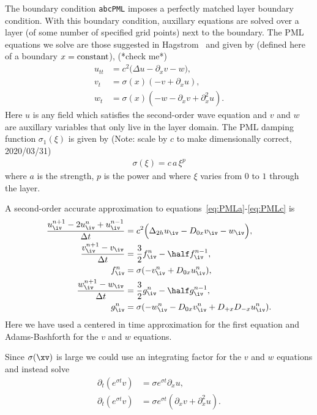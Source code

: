 \documentclass{article}
\begin{document}
The boundary condition {\tt abcPML} imposes a perfectly matched layer boundary condition.
With this boundary condition, auxillary equations are solved over a layer (of some number of
specified grid points) next to the boundary. The PML equations we solve
are those suggested in Hagstrom~\cite{Hagstrom1999} and given by (defined here of a boundary $x={\rm constant}$), (*check me*)
\begin{align}
  u_{tt} &= c^2 \Big( \Delta u - \partial_x v - w \Big), \label{eq:PMLa} \\
   v_t &= \sigma(x)( -v + \partial_x u ) , \\
   w_t &= \sigma(x) ( -w  - \partial_x v + \partial_x^2 u ). \label{eq:PMLc}
\end{align}
Here $u$ is any field which satisfies the second-order wave equation and $v$ and $w$ are auxillary variables
that only live in the layer domain. 
The PML damping function $\sigma_1(\xi)$ is given by (Note: scale by $c$ to make dimensionally correct, 2020/03/31) 
\begin{align}
  \sigma(\xi) = c\, a \, \xi^p
\end{align}
where $a$ is the strength, $p$ is the power and where $\xi$ varies from $0$ to $1$ through the layer.



A second-order accurate approximation to equations~\eqref{eq:PMLa}-\eqref{eq:PMLc} is
\begin{align}
  {u_\iv^{n+1} - 2 u_\iv^n + u_\iv^{n-1} \over \dt} &= c^2 \Big( \Delta_{2h} u_\iv - D_{0x} v_\iv  - w_\iv \Big), \label{eq:PMLorder2a}\\
  {v_\iv^{n+1} - v_\iv \over \dt} &= \frac{3}{2} f_\iv^{n} - \half f_\iv^{n-1} , \\
  f_\iv^n  &= \sigma ( -v_\iv^n + D_{0x} u_\iv^n ) , \\
  {w_\iv^{n+1} - w_\iv \over \dt} &= \frac{3}{2} g_\iv^{n} - \half g_\iv^{n-1} , \\
  g_\iv^n  &= \sigma ( -w_\iv^n  - D_{0x} v_\iv^n + D_{+x}D_{-x} u_\iv^n ).   \label{eq:PMLorder2e}
\end{align}
Here we have used a centered in time approximation for the first equation and Adams-Bashforth for the $v$ and $w$ equations.

 Since $\sigma(\xv)$ is large we could use an integrating factor for the $v$ and $w$ equations
and instead solve 
\begin{align}
  \partial_t( e^{\sigma t} v) &= \sigma  e^{\sigma t} \partial_x u  , \\
   \partial_t( e^{\sigma t} v) &= \sigma e^{\sigma t} ( \partial_x v + \partial_x^2 u ). 
\end{align}
\end{document}
